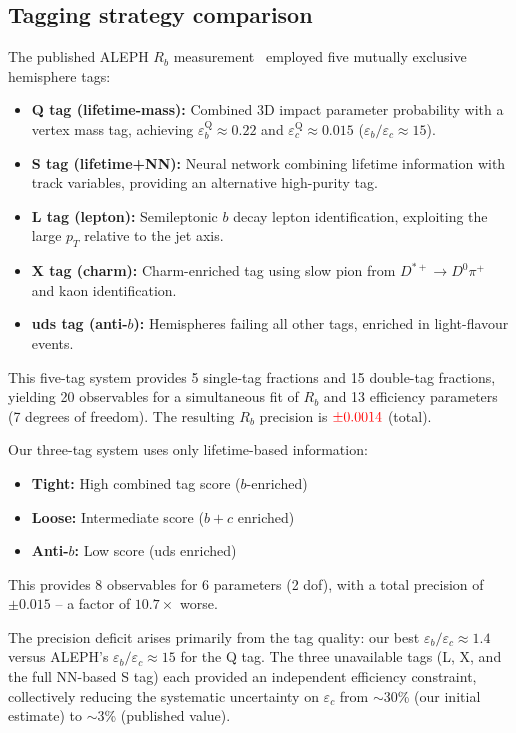 \documentclass[11pt,a4paper]{article}
\newcommand{\external}[1]{\textcolor{red}{#1}}
\begin{document}
\subsection{Tagging strategy comparison}
\label{sec:method:tagging}

The published ALEPH $R_b$ measurement~\cite{ALEPH:Rb:1996}
employed five mutually exclusive hemisphere tags:
\begin{itemize}
\item \textbf{Q tag (lifetime-mass):} Combined 3D impact parameter
  probability with a vertex mass tag, achieving
  $\varepsilon_b^\text{Q} \approx 0.22$ and
  $\varepsilon_c^\text{Q} \approx 0.015$
  ($\varepsilon_b/\varepsilon_c \approx 15$).
\item \textbf{S tag (lifetime+NN):} Neural network combining
  lifetime information with track variables, providing an
  alternative high-purity tag.
\item \textbf{L tag (lepton):} Semileptonic $b$ decay lepton
  identification, exploiting the large $p_T$ relative to the
  jet axis.
\item \textbf{X tag (charm):} Charm-enriched tag using slow pion
  from $D^{*+} \to D^0\pi^+$ and kaon identification.
\item \textbf{uds tag (anti-$b$):} Hemispheres failing all other
  tags, enriched in light-flavour events.
\end{itemize}

This five-tag system provides 5 single-tag fractions and 15
double-tag fractions, yielding 20 observables for a simultaneous
fit of $R_b$ and 13 efficiency parameters (7 degrees of freedom).
The resulting $R_b$ precision is
$\external{\pm 0.0014}$ (total).

Our three-tag system uses only lifetime-based information:
\begin{itemize}
\item \textbf{Tight:} High combined tag score ($b$-enriched)
\item \textbf{Loose:} Intermediate score ($b+c$ enriched)
\item \textbf{Anti-$b$:} Low score (uds enriched)
\end{itemize}
This provides 8 observables for 6 parameters (2 dof), with a
total precision of $\pm 0.015$ -- a factor of $10.7\times$
worse.

The precision deficit arises primarily from the tag quality:
our best $\varepsilon_b/\varepsilon_c \approx 1.4$ versus
ALEPH's $\varepsilon_b/\varepsilon_c \approx 15$ for the Q tag.
The three unavailable tags (L, X, and the full NN-based S tag)
each provided an independent efficiency constraint, collectively
reducing the systematic uncertainty on $\varepsilon_c$ from
$\sim$30\% (our initial estimate) to $\sim$3\% (published value).
\end{document}

